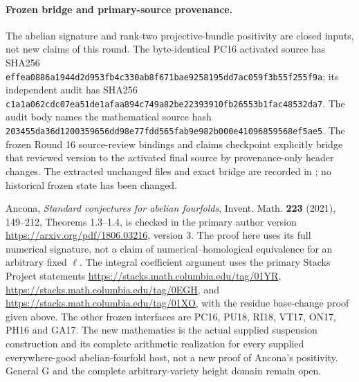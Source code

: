 \paragraph{Frozen bridge and primary-source provenance.}
The abelian signature and rank-two projective-bundle
positivity are closed inputs, not new claims of
this round.  The byte-identical PC16 activated
source has SHA256
\texttt{effea0886a1944d2d953fb4c330ab8f671bae9258195dd7ac059f3b55f255f9a};
its independent audit has SHA256
\texttt{c1a1a062cdc07ea51de1afaa894c749a82be22393910fb26553b1fac48532da7}.
The audit body names the mathematical source hash
\texttt{203455da36d1200359656dd98e77fdd565fab9e982b000e41096859568ef5ae5}.
The frozen Round 16 source-review bindings and
claims checkpoint explicitly bridge that reviewed
version to the activated final source by
provenance-only header changes.  The extracted
unchanged files and exact bridge are recorded in
;
no historical frozen state has been changed.

Ancona, \emph{Standard conjectures for abelian
fourfolds}, Invent. Math. \textbf{223} (2021),
149--212, Theorems 1.3--1.4, is checked in the
primary author version
\url{https://arxiv.org/pdf/1806.03216}, version 3.
The proof here uses its full numerical signature,
not a claim of numerical--homological equivalence
for an arbitrary fixed $\ell$.  The integral
coefficient argument uses the primary Stacks
Project statements
\url{https://stacks.math.columbia.edu/tag/01YR},
\url{https://stacks.math.columbia.edu/tag/0EGH},
and
\url{https://stacks.math.columbia.edu/tag/01XO},
with the residue base-change proof given above.
The other frozen interfaces are PC16, PU18,
RI18, VT17, ON17, PH16 and GA17.  The new
mathematics is the actual supplied suspension
construction and its complete arithmetic
realization for every supplied everywhere-good
abelian-fourfold host, not a new proof of
Ancona's positivity.  General G and the
complete arbitrary-variety height domain
remain open.

